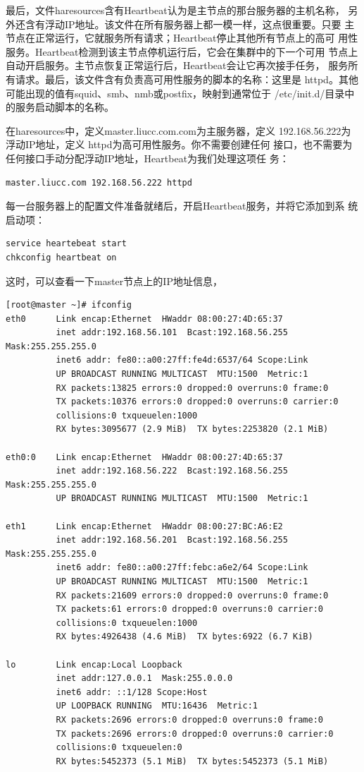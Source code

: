 最后，文件haresources含有Heartbeat认为是主节点的那台服务器的主机名称，
另外还含有浮动IP地址。该文件在所有服务器上都一模一样，这点很重要。只要
主节点在正常运行，它就服务所有请求；Heartbeat停止其他所有节点上的高可
用性服务。Heartbeat检测到该主节点停机运行后，它会在集群中的下一个可用
节点上自动开启服务。主节点恢复正常运行后，Heartbeat会让它再次接手任务，
服务所有请求。最后，该文件含有负责高可用性服务的脚本的名称：这里是
httpd。其他可能出现的值有squid、smb、nmb或postfix，映射到通常位于
/etc/init.d/目录中的服务启动脚本的名称。

在haresources中，定义master.liucc.com.com为主服务器，定义
192.168.56.222为浮动IP地址，定义 httpd为高可用性服务。你不需要创建任何
接口，也不需要为任何接口手动分配浮动IP地址，Heartbeat为我们处理这项任
务：

\begin{verbatim}
master.liucc.com 192.168.56.222 httpd
\end{verbatim}

每一台服务器上的配置文件准备就绪后，开启Heartbeat服务，并将它添加到系
统启动项：

\begin{verbatim}
service heartebeat start
chkconfig heartbeat on
\end{verbatim}

这时，可以查看一下master节点上的IP地址信息，

\begin{verbatim}
[root@master ~]# ifconfig 
eth0      Link encap:Ethernet  HWaddr 08:00:27:4D:65:37  
          inet addr:192.168.56.101  Bcast:192.168.56.255  Mask:255.255.255.0
          inet6 addr: fe80::a00:27ff:fe4d:6537/64 Scope:Link
          UP BROADCAST RUNNING MULTICAST  MTU:1500  Metric:1
          RX packets:13825 errors:0 dropped:0 overruns:0 frame:0
          TX packets:10376 errors:0 dropped:0 overruns:0 carrier:0
          collisions:0 txqueuelen:1000 
          RX bytes:3095677 (2.9 MiB)  TX bytes:2253820 (2.1 MiB)

eth0:0    Link encap:Ethernet  HWaddr 08:00:27:4D:65:37  
          inet addr:192.168.56.222  Bcast:192.168.56.255  Mask:255.255.255.0
          UP BROADCAST RUNNING MULTICAST  MTU:1500  Metric:1

eth1      Link encap:Ethernet  HWaddr 08:00:27:BC:A6:E2  
          inet addr:192.168.56.201  Bcast:192.168.56.255  Mask:255.255.255.0
          inet6 addr: fe80::a00:27ff:febc:a6e2/64 Scope:Link
          UP BROADCAST RUNNING MULTICAST  MTU:1500  Metric:1
          RX packets:21609 errors:0 dropped:0 overruns:0 frame:0
          TX packets:61 errors:0 dropped:0 overruns:0 carrier:0
          collisions:0 txqueuelen:1000 
          RX bytes:4926438 (4.6 MiB)  TX bytes:6922 (6.7 KiB)

lo        Link encap:Local Loopback  
          inet addr:127.0.0.1  Mask:255.0.0.0
          inet6 addr: ::1/128 Scope:Host
          UP LOOPBACK RUNNING  MTU:16436  Metric:1
          RX packets:2696 errors:0 dropped:0 overruns:0 frame:0
          TX packets:2696 errors:0 dropped:0 overruns:0 carrier:0
          collisions:0 txqueuelen:0 
          RX bytes:5452373 (5.1 MiB)  TX bytes:5452373 (5.1 MiB)
\end{verbatim}

